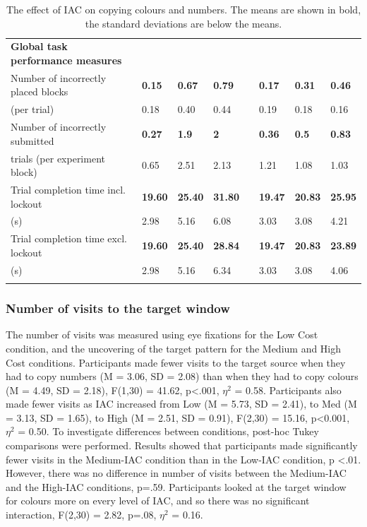 \begin{table}
\begin{tabular}{@{}p{6cm}lllclll@{}}
\textbf{Global task performance measures}\\
Number of incorrectly placed blocks 
				  		    & \textbf{0.15} & \textbf{0.67} & \textbf{0.79} && \textbf{0.17} & \textbf{0.31} & \textbf{0.46} \\
(per trial) 				       	    &              0.18   & 		  0.40  & 	         0.44  && 		 0.19  & 	         0.18 & 	      0.16 \\
Number of incorrectly submitted
				  		    & \textbf{0.27} & \textbf{1.9} & \textbf{2} && \textbf{0.36} & \textbf{0.5} & \textbf{0.83} \\
trials (per experiment block)	    &              0.65   & 		2.51 & 	   2.13  && 		 1.21  & 	         1.08 & 	      1.03 \\
Trial completion time incl. lockout
				  		    & \textbf{19.60} & \textbf{25.40} & \textbf{31.80} && \textbf{19.47} & \textbf{20.83} & \textbf{25.95} \\
(s)						    &                2.98   & 		5.16 & 	   	     6.08  && 	         3.03  & 	        3.08   & 	         4.21 \\
Trial completion time excl. lockout
				  		    & \textbf{19.60} & \textbf{25.40} & \textbf{28.84} && \textbf{19.47} & \textbf{20.83} & \textbf{23.89} \\
(s)						    &              2.98   & 		5.16 & 	   6.34  && 		 3.03  & 	         3.08 & 	      4.06 \\

\bottomrule
\caption[Study 3 descriptive measures]{The effect of IAC on copying colours and numbers. The means are shown in bold, the standard deviations are below the means.}
\end{tabular}
\label{table:ch4_IACmeans}
\end{table}

\subsubsection{Number of visits to the target window}
The number of visits was measured using eye fixations for the Low Cost condition, and the uncovering of the target pattern for the Medium and High Cost conditions. Participants made fewer visits to the target source when they had to copy numbers (M = 3.06, SD = 2.08) than when they had to copy colours (M = 4.49, SD = 2.18), F(1,30) = 41.62, p<.001, $\eta^2$  = 0.58. Participants also made fewer visits as IAC increased from Low (M = 5.73, SD = 2.41), to Med (M = 3.13, SD = 1.65), to High (M = 2.51, SD = 0.91), F(2,30) = 15.16, p<0.001, $\eta^2$  = 0.50. To investigate differences between conditions, post-hoc Tukey comparisons were performed. Results showed that participants made significantly fewer visits in the Medium-IAC condition than in the Low-IAC condition, p <.01. However, there was no difference in number of visits between the Medium-IAC and the High-IAC conditions, p=.59. Participants looked at the target window for colours more on every level of IAC, and so there was no significant interaction, F(2,30) = 2.82, p=.08, $\eta^2$  = 0.16. 

